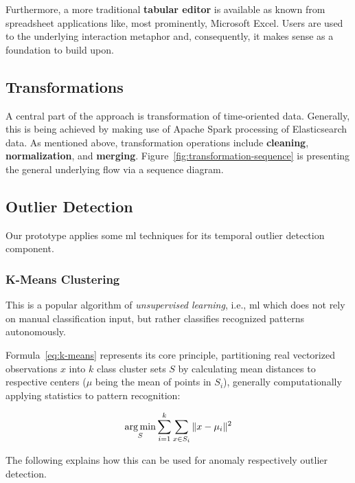 Furthermore, a more traditional \textbf{tabular editor} is available as known from spreadsheet applications like, most prominently, Microsoft Excel. Users are used to the underlying interaction metaphor and, consequently, it makes sense as a foundation to build upon.

\subsection{Transformations}

A central part of the approach is transformation of time-oriented data.
Generally, this is being achieved by making use of Apache Spark processing of Elasticsearch data.
As mentioned above, transformation operations include \textbf{cleaning}, \textbf{normalization}, and \textbf{merging}.
Figure~\ref{fig:transformation-sequence} is presenting the general underlying flow via a sequence diagram.


\subsection{Outlier Detection}

Our prototype applies some \gls{ml} techniques for its temporal outlier detection component.


\subsubsection{K-Means Clustering}

This is a popular algorithm of \emph{unsupervised learning}, i.e., \gls{ml} which does not rely on manual classification input, but rather classifies recognized patterns autonomously.

Formula~\ref{eq:k-means} represents its core principle, partitioning real vectorized observations $x$ into $k$ class cluster sets $S$ by calculating mean distances to respective centers ($\mu$ being the mean of points in $S_i$), generally computationally applying statistics to pattern recognition:

\begin{equation}
\operatorname*{arg\,min}_{S} \sum_{i=1}^{k} \sum_{x \in S_{i}} \|x - \mu_{i}\|^{2}
\label{eq:k-means}
\end{equation}

The following explains how this can be used for anomaly respectively outlier detection.

